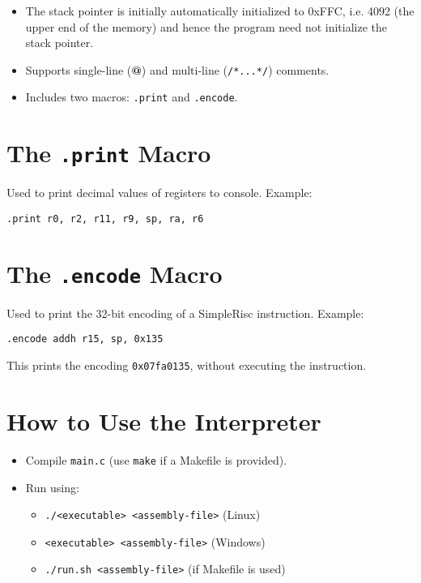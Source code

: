 \documentclass[12pt]{article}
\begin{document}
\begin{itemize}[leftmargin=*]
  \item The stack pointer is initially automatically initialized to 0xFFC, i.e. 4092 (the upper end
of the memory) and hence the program need not initialize the stack pointer.

  \item Supports single-line (\textbf{@}) and multi-line (\texttt{/*...*/}) comments.
  
  \item Includes two macros: \texttt{.print} and \texttt{.encode}.
\end{itemize}

\section*{The \texttt{.print} Macro}

Used to print decimal values of registers to console.  
Example:
\begin{lstlisting}[language={},basicstyle=\ttfamily]
.print r0, r2, r11, r9, sp, ra, r6
\end{lstlisting}

\section*{The \texttt{.encode} Macro}
Used to print the 32-bit encoding of a SimpleRisc instruction.  
Example:
\begin{lstlisting}[language={},basicstyle=\ttfamily]
.encode addh r15, sp, 0x135
\end{lstlisting}
This prints the encoding \texttt{0x07fa0135}, without executing the instruction.

\section*{How to Use the Interpreter}
\begin{itemize}[leftmargin=*]
  \item Compile \texttt{main.c} (use \texttt{make} if a Makefile is provided).
  \item Run using:
  \begin{itemize}
    \item \texttt{./<executable> <assembly-file>} (Linux)
    \item \texttt{<executable> <assembly-file>} (Windows)
    \item \texttt{./run.sh <assembly-file>} (if Makefile is used)
  \end{itemize}
\end{itemize}
\end{document}
